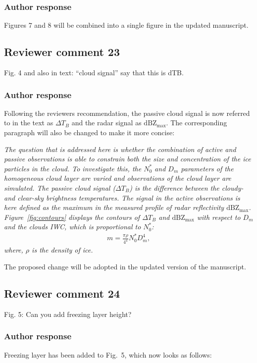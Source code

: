 \documentclass[11pt]{scrartcl}
\begin{document}
\subsubsection*{Author response}

Figures 7 and 8 will be combined into a single figure in the updated manuscript.

\subsection*{Reviewer comment 23}
Fig. 4 and also in text: “cloud signal” say that this is dTB.

\subsubsection*{Author response}

Following the reviewers recommendation, the passive cloud signal is now
referred to in the text as $\Delta T_B$ and the radar signal as
$\text{dBZ}_\text{max}$. The corresponding paragraph will also be changed
to make it more concise:

{\itshape 
The question that is addressed here is whether the combination of active and
passive observations is able to constrain both the size and concentration of the
ice particles in the cloud. To investigate this, the $N_0^*$ and $D_m$
parameters of the homogeneous cloud layer are varied and observations of the
cloud layer are simulated. The passive cloud signal ($\Delta T_B$) is the
difference between the cloudy- and clear-sky  brightness temperatures. The
signal in the active observations is here defined as the maximum in the measured
profile of radar reflectivity $\text{dBZ}_\text{max}$. Figure~\ref{fig:contours}
displays the contours of $\Delta T_B$ and $\text{dBZ}_\text{max}$ with respect
to $D_m$ and the clouds IWC, which is proportional to $N_0^*$:
\begin{align}
m = \frac{\pi \rho}{4 ^ 4}N_0^* D_m^4,
\end{align}
where, $\rho$ is the density of ice.

  }


The proposed change will be adopted in the updated version of the manuscript.

\subsection*{Reviewer comment 24}
Fig. 5: Can you add freezing layer height?

\subsubsection*{Author response}
Freezing layer has been added to Fig.~5, which now looks as follows:
\end{document}
